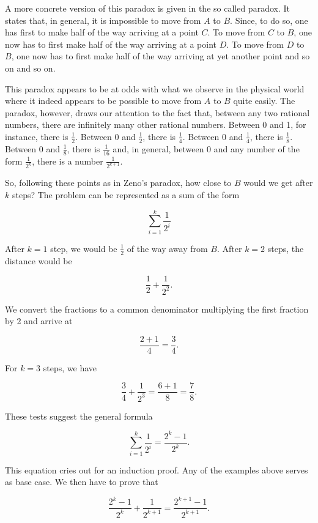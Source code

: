 \documentclass[tikz]{scrreprt}
\begin{document}
A more concrete version of this paradox is given in
the so called  paradox.
It states that, in general, it is impossible 
to move from $A$ to $B$.
Since, to do so, one has first to make half of the way
arriving at a point $C$. To move from $C$ to $B$,
one now has to first make half of the way
arriving at a point $D$. To move from $D$ to $B$,
one now has to first make half of the way
arriving at yet another point and so on and so on.

This paradox appears to be at odds with 
what we observe in the physical world where it
indeed appears to be possible to move from
$A$ to $B$ quite easily.
The paradox, however, draws our attention to
the fact that, between any two rational numbers,
there are infinitely many other rational numbers.
Between 0 and 1, for instance, there is $\frac{1}{2}$.
Between 0 and $\frac{1}{2}$, there is $\frac{1}{4}$.
Between 0 and $\frac{1}{4}$, there is $\frac{1}{8}$.
Between 0 and $\frac{1}{8}$, there is $\frac{1}{16}$
and, in general, between 0 and any number of the form
$\frac{1}{2^k}$, there is a number $\frac{1}{2^{k+1}}$.

So, following these points as in Zeno's paradox,
how close to $B$ would we get after $k$ steps?
The problem can be represented as a sum of the form

\[
\sum_{i=1}^k{\frac{1}{2^i}}
\]

After $k=1$ step, we would be $\frac{1}{2}$ of the way
away from $B$. After $k=2$ steps, the distance would be

\[
\frac{1}{2} + \frac{1}{2^2}.
\]

We convert the fractions to a common denominator
multiplying the first fraction by 2 and arrive at

\[
\frac{2+1}{4} = \frac{3}{4}. 
\]

For $k=3$ steps, we have

\[
\frac{3}{4} + \frac{1}{2^3} =
\frac{6+1}{8} = \frac{7}{8}.
\]

These tests suggest the general formula

\begin{equation}\label{eq:Zeno2}
\sum_{i=1}^k{\frac{1}{2^i}} =
\frac{2^k - 1}{2^k}.
\end{equation}

This equation cries out for an induction proof.
Any of the examples above serves as base case.
We then have to prove that

\begin{equation}
\frac{2^k - 1}{2^k} + \frac{1}{2^{k+1}} = 
\frac{2^{k+1}-1}{2^{k+1}}.
\end{equation}
\end{document}
